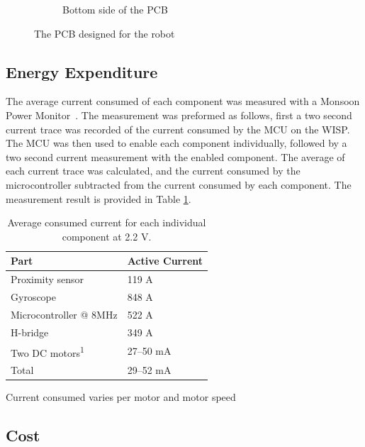 \begin{figure}[h!]
\begin{subfigure}[b]{0.45\textwidth}
		\caption{Bottom side of the PCB}
		\label{fig:pcb_robot_back}
	\end{subfigure}
	\caption{The PCB designed for the robot}
	\label{fig:pcb_robot}
\end{figure}

\subsection{Energy Expenditure}

The average current consumed of each component was measured with a Monsoon Power Monitor~\cite{monsoon_powermonitor_2017}.
The measurement was preformed as follows, first a two second current trace was recorded of the current consumed by the MCU on the WISP.
The MCU was then used to enable each component individually, followed by a two second current measurement with the enabled component.
The average of each current trace was calculated, and the current consumed by the microcontroller subtracted from the current consumed by each component.
The measurement result is provided in Table \ref{tab:avg_cur_comp}.


\begin{table}[t]
	\centering
	\begin{threeparttable}
		\caption{Average consumed current for each individual component at 2.2 V.}
		\label{tab:avg_cur_comp}
		\begin{tabular}{|l|l|} 
			\hline
			Part & Active Current \\
			\hline\hline
			Proximity sensor & 119 \textmu A \\
			Gyroscope & 848 \textmu A\\	
			Microcontroller @ 8MHz & 522 \textmu A\\
			H-bridge & 349 \textmu A \\
			Two DC motors\textsuperscript{1} & 27--50 mA  \\
			\hline \hline
			Total & 29--52 mA \\
			\hline
		\end{tabular}
		\begin{tablenotes}
		\small
		\item [1] Current consumed varies per motor and motor speed
		\end{tablenotes}
	\end{threeparttable}
\end{table}

\subsection{Cost}

